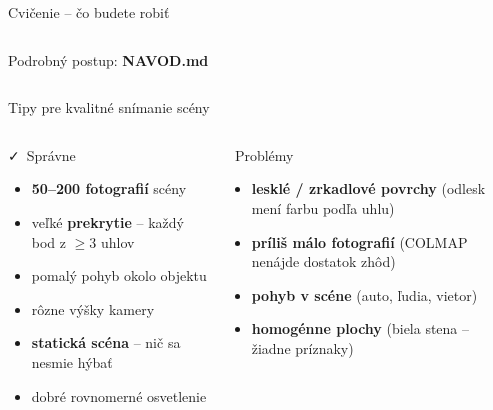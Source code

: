 \documentclass[aspectratio=169]{beamer}
\newcommand{\red}[1]{\textcolor{pvsoRed}{\textbf{#1}}}
\begin{document}
\begin{frame}{Cvičenie – čo budete robiť}
\begin{columns}[t]
\begin{alertblock}{}
Podrobný postup: \textbf{NAVOD.md}
\end{alertblock}

\end{columns}

\end{frame}

\begin{frame}{Tipy pre kvalitné snímanie scény}

\begin{columns}[t]
\begin{block}{\faCheck\ Správne}
\begin{itemize}\setlength{\itemsep}{2pt}
    \item \textbf{50–200 fotografií} scény
    \item veľké \textbf{prekrytie} – každý bod z $\geq$3 uhlov
    \item pomalý pohyb okolo objektu
    \item rôzne výšky kamery
    \item \textbf{statická scéna} – nič sa nesmie hýbať
    \item dobré rovnomerné osvetlenie
\end{itemize}
\end{block}

\begin{alertblock}{\faTimes\ Problémy}
\begin{itemize}\setlength{\itemsep}{2pt}
    \item \red{lesklé / zrkadlové povrchy}
    {\footnotesize(odlesk mení farbu podľa uhlu)}
    \item \red{príliš málo fotografií}
    {\footnotesize(COLMAP nenájde dostatok zhôd)}
    \item \red{pohyb v scéne}
    {\footnotesize(auto, ľudia, vietor)}
    \item \red{homogénne plochy}
    {\footnotesize(biela stena – žiadne príznaky)}
\end{itemize}
\end{alertblock}
\end{columns}


\end{frame}
\end{document}
